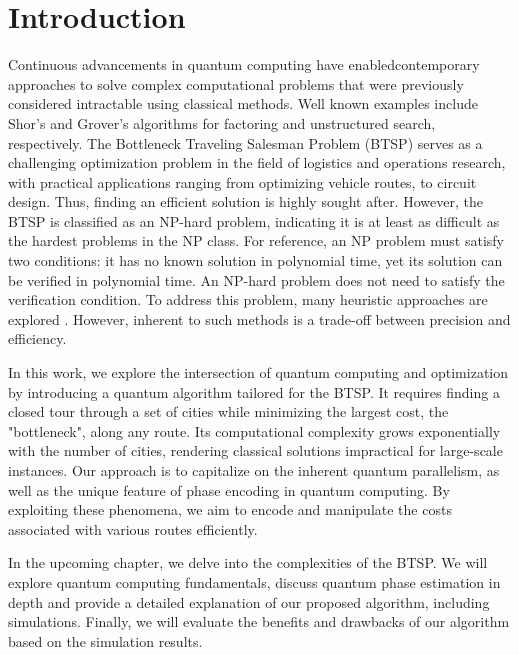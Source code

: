 \documentclass[msc,oneside]{ubcthesis}
\begin{document}
	
	\mainmatter
	
	\chapter{Introduction}

	
	
Continuous advancements in quantum computing have enabledcontemporary approaches to solve complex computational problems that were previously considered intractable using classical methods. Well known examples include Shor's \cite{Shor} and Grover's \cite{grover1996fast} algorithms for factoring and unstructured search, respectively. The Bottleneck Traveling Salesman Problem (BTSP) serves as a challenging optimization problem in the field of logistics and operations research, with practical applications ranging from optimizing vehicle routes, to circuit design. Thus, finding an efficient solution is highly sought after. However, the BTSP is classified as an NP-hard problem, indicating it is at least as difficult as the hardest problems in the NP class. For reference, an NP problem must satisfy two conditions: it has no known solution in polynomial time, yet its solution can be verified in polynomial time. An NP-hard problem does not need to satisfy the verification condition. To address this problem, many heuristic approaches are explored \cite{heuristicthesis}\cite{heuristic}. However, inherent to such methods is a trade-off between precision and efficiency.

In this work, we explore the intersection of quantum computing and optimization by introducing a quantum algorithm tailored for the BTSP. It requires finding a closed tour through a set of cities while minimizing the largest cost, the "bottleneck", along any route. Its computational complexity grows exponentially with the number of cities, rendering classical solutions impractical for large-scale instances. Our approach is to capitalize on the inherent quantum parallelism, as well as the unique feature of phase encoding in quantum computing. By exploiting these phenomena, we aim to encode and manipulate the costs associated with various routes efficiently. 

In the upcoming chapter, we delve into the complexities of the BTSP. We will explore quantum computing fundamentals, discuss quantum phase estimation in depth and provide a detailed explanation of our proposed algorithm, including simulations. Finally, we will evaluate the benefits and drawbacks of our algorithm based on the simulation results.
	
\end{document}
